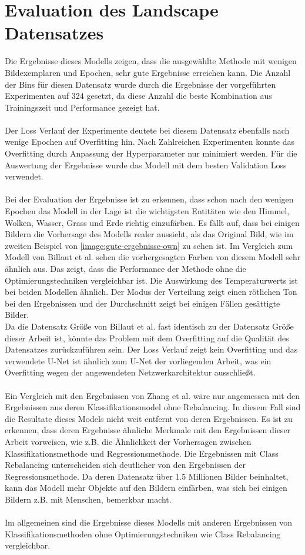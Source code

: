 \section{Evaluation des Landscape Datensatzes}
Die Ergebnisse dieses Modells zeigen, dass die ausgewählte Methode mit wenigen Bildexemplaren und Epochen, sehr gute Ergebnisse erreichen kann.
Die Anzahl der Bins für diesen Datensatz wurde durch die Ergebnisse der vorgeführten Experimenten auf 324 gesetzt, da diese Anzahl die beste Kombination
aus Trainingszeit und Performance gezeigt hat.
\\
\\
Der Loss Verlauf der Experimente deutete bei diesem Datensatz ebenfalls nach wenige Epochen auf Overfitting hin. Nach Zahlreichen Experimenten
konnte das Overfitting durch Anpassung der Hyperparameter nur minimiert werden. Für die Auswertung der Ergebnisse wurde das Modell mit dem besten
Validation Loss verwendet.
\\
\\
Bei der Evaluation der Ergebnisse ist zu erkennen, dass schon nach den wenigen Epochen das Modell in der Lage ist die wichtigsten Entitäten wie den Himmel, Wolken, Wasser,
Grass und Erde richtig einzufärben. Es fällt auf, dass bei einigen Bildern die Vorhersage des Modells realer aussieht, als das Original Bild,
wie im zweiten Beispiel von \ref{image:gute-ergebnisse-own} zu sehen ist. Im Vergleich zum Modell von Billaut et al. sehen die vorhergesagten 
Farben von diesem Modell sehr ähnlich aus. Das zeigt, dass die Performance der Methode ohne die Optimierungstechniken vergleichbar ist.
Die Auswirkung des Temperaturwerts ist bei beiden Modellen ähnlich. Der Modus der Verteilung zeigt einen rötlichen Ton bei den
Ergebnissen und der Durchschnitt zeigt bei einigen Fällen gesättigte Bilder.
\\
Da die Datensatz Größe von Billaut et al. fast identisch zu der Datensatz Größe dieser Arbeit ist, könnte das Problem mit dem Overfitting
auf die Qualität des Datensatzes zurückzuführen sein. Der Loss Verlauf zeigt kein Overfitting und das verwendete U-Net ist ähnlich zum
U-Net der vorliegenden Arbeit, was ein Overfitting wegen der angewendeten Netzwerkarchitektur ausschließt. 
\\
\\
Ein Vergleich mit den Ergebnissen von Zhang et al. wäre nur angemessen mit den Ergebnissen aus deren Klassifikationsmodel ohne Rebalancing.
In diesem Fall sind die Resultate dieses Models nicht weit entfernt von deren Ergebnissen. Es ist zu erkennen, dass deren Ergebnisse ähnliche
Merkmale mit den Ergebnissen dieser Arbeit vorweisen, wie z.B. die Ähnlichkeit der Vorhersagen zwischen Klassifikationsmethode und Regressionsmethode.
Die Ergebnissen mit Class Rebalancing unterscheiden sich deutlicher von den Ergebnissen der Regressionsmethode. 
Da deren Datensatz über 1.5 Millionen Bilder beinhaltet, kann das Modell mehr Objekte auf den
Bildern einfärben, was sich bei einigen Bildern z.B. mit Menschen, bemerkbar macht. 
\\
\\
Im allgemeinen sind die Ergebnisse dieses Modells mit anderen Ergebnissen von Klassifikationsmethoden ohne Optimierungstechniken wie Class Rebalancing
vergleichbar.